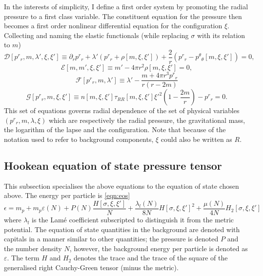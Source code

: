 In the interests of simplicity, I define a first order system by promoting the radial pressure to a first class variable. The constituent equation for the pressure then becomes a first order nonlinear differential equation for the configuration $\xi$. Collecting and naming the elastic functionals (while replacing $\sigma$ with its relation to $m$)
\begin{equation}
\mathcal{D}[p^r{}_r,m,\lambda',\xi,\xi'] \equiv \partial_r p^r{}_r + \lambda'
\left( p^r{}_r + \rho[m,\xi,\xi']\right)
+\frac{2}{r}\left(p^r{}_r - p^\theta{}_\theta[m,\xi,\xi']\right) = 0,
\label{eq:functionalhydro}
\end{equation}
\begin{equation}
\mathcal{E}[m,m',\xi,\xi'] \equiv m' - 4\pi r^2\rho[m,\xi,\xi'] = 0,
\label{eq:functionalrr}
\end{equation}
\begin{equation}
\mathcal{F}[p^r{}_r,m,\lambda'] \equiv \lambda' - \frac{m + 4\pi r^3 p^r{}_r}{r(r-2m)}
\label{eq:functionaltt}
\end{equation}
\begin{equation}
\mathcal{G}[p^r{}_r,m,\xi,\xi'] \equiv n[m,\xi,\xi']\tau_{RR}[m,\xi,\xi']\xi'^2\left(1 - \frac{2m}{r}\right) - p^r{}_r = 0.
\label{eq:functionalelastic}
\end{equation}
This set of equations governs radial dependence of the set of physical variables $(p^r{}_r,m,\lambda,\xi)$ which are respectively the radial pressure, the gravitational mass, the logarithm of the lapse and the configuration. Note that because of the notation used to refer to background components, $\xi$ could also be written as $R$.

\subsection{Hookean equation of state pressure tensor}
This subsection specialises the above equations to the equation of state chosen above. The energy per particle is \eqref{eqn:eos}
\begin{equation}
\nonumber\epsilon = \displaystyle{m_p + m_p\varepsilon(N) + P(N)\frac{H[\sigma,\xi,\xi']}{N}}
 +  \frac{\lambda_l(N)}{8N}H[\sigma,\xi,\xi']^2 + \frac{\mu(N)}{4N}H_2[\sigma,\xi,\xi']
\end{equation}
where $\lambda_l$ is the Lam\'e coefficient subscripted to distinguish it from the metric potential. The equation of state quantities in the background are denoted with capitals in a manner similar to other quantities; the pressure is denoted $P$ and the number density $N$, however, the background energy per particle is denoted as $\varepsilon$. The term $H$ and $H_2$ denotes the trace and the trace of the square of the generalised right Cauchy-Green tensor (minus the metric).

